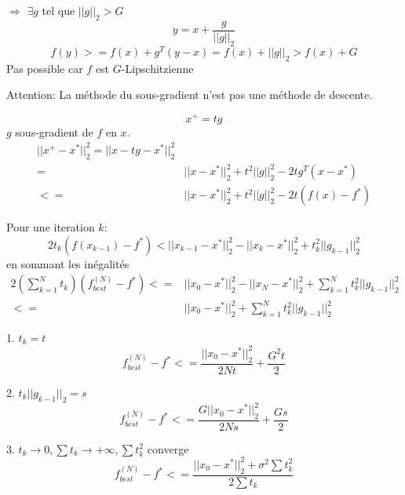 \documentclass{article}
\begin{document}
$\Rightarrow$
$\exists g$ tel que $||g||_2>G$
\begin{equation}
y=x+\frac{g}{||g||_2}
\end{equation}
\begin{equation}
f(y)>=f(x)+g^T(y-x)=f(x)+||g||_2>f(x)+G
\end{equation}
Pas possible car $f$ est $G$-Lipschitzienne

Attention: 
La m\'ethode du sous-gradient n'est pas une m\'ethode de descente.

\begin{equation}
x^+=tg
\end{equation}
$g$ sous-gradient de $f$ en $x$.
\begin{equation}
\begin{split}
||x^+-x^*||^2_2=||x-tg-x^*||_2^2\\
=&||x-x^*||_2^2+t^2||g||_2^2-2tg^T(x-x^*)\\
<=&||x-x^*||_2^2+t^2||g||_2^2-2t(f(x)-f^*)
\end{split}
\end{equation}

Pour une iteration $k$:
\begin{equation}
2t_k (f(x_{k-1})-f^*)<||x_{k-1}-x^*||_2^2-||x_k-x^*||_2^2+t_k^2||g_{k-1}||_2^2
\end{equation}
en sommant les in\'egalit\'es
\begin{equation}
\begin{split}
2(\sum_{k=1}^N t_k)(f_{best}^(N)-f^*)<=& ||x_0-x^*||_2^2-||x_N-x^*||_2^2+\sum_{k=1}^N t_k^2||g_{k-1}||_2^2\\
<=& ||x_0-x^*||_2^2+\sum_{k=1}^N t_k^2||g_{k-1}||_2^2
\end{split}
\end{equation}

1. $t_k=t$
\begin{equation}
f_{best}^{(N)}-f^*<=\frac{||x_0-x^*||_2^2}{2Nt}+\frac{G^2t}{2}
\end{equation}

2. $t_k ||g_{k-1}||_2=s$
\begin{equation}
f_{best}^{(N)}-f^*<=\frac{G||x_0-x^*||_2^2}{2Ns}+\frac{Gs}{2}
\end{equation}

3. $t_k\to 0,\sum t_k\to +\infty, \sum t_k^2$ converge
\begin{equation}
f_{best}^{(N)}-f^*<=\frac{||x_0-x^*||_2^2+\sigma^2\sum t_k^2}{2\sum t_k}
\end{equation}
\end{document}
